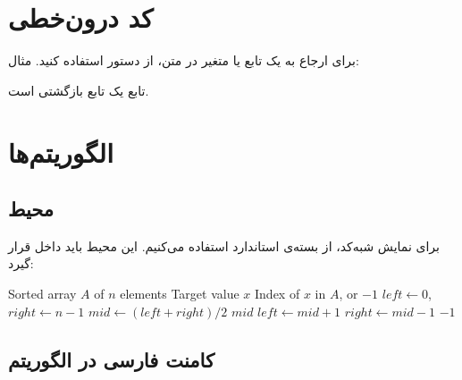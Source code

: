 \section{کد درون‌خطی}
\label{sec:code-inline}

برای ارجاع به یک تابع یا متغیر در متن، از
دستور  استفاده کنید. مثال:

تابع  یک تابع بازگشتی است.


\section{الگوریتم‌ها}
\label{sec:code-algorithms}

\subsection{محیط }
\label{sec:code-algorithm-basic}

برای نمایش شبه‌کد، از بسته‌ی استاندارد
 استفاده می‌کنیم. این محیط
باید داخل  قرار گیرد:

\begin{latin}
\begin{algorithm}
\caption{جستجوی دودویی}
\label{alg:binary}
\begin{algorithmic}[1]
    \Require Sorted array $A$ of $n$ elements
    \Require Target value $x$
    \Ensure Index of $x$ in $A$, or $-1$
    \State $left \gets 0$, $right \gets n - 1$
        \State $mid \gets (left + right) / 2$
            \State \Return $mid$
            \State $left \gets mid + 1$
        \Else
            \State $right \gets mid - 1$
        \EndIf
    \EndWhile
    \State \Return $-1$
\end{algorithmic}
\end{algorithm}
\end{latin}


\subsection{کامنت فارسی در الگوریتم}
\label{sec:code-algorithm-comment}

